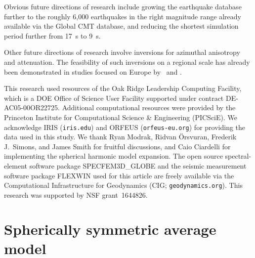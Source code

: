 \documentclass[extra,mreferee]{gji}
\begin{document}

Obvious future directions of research include growing the earthquake database further to the roughly 6,000 earthquakes in the right magnitude range already available via the Global CMT database,
and reducing the shortest simulation period further from 17~s to 9~s.

Other future directions of research involve inversions for azimuthal anisotropy
and attenuation.
The feasibility of such inversions on a regional scale has already been demonstrated in studies focused on Europe by~\cite{ZhuTromp2013} and \cite{Zhuetal2013}.

\begin{acknowledgments}
This research used resources of the Oak Ridge Leadership Computing Facility,
which is a DOE Office of Science User Facility supported under contract DE-AC05-00OR22725.
Additional computational resources were provided by the Princeton Institute
for Computational Science \& Engineering (PICSciE).
We acknowledge IRIS ({\tt iris.edu}) and ORFEUS ({\tt orfeus-eu.org}) for
providing the data used in this study.
We thank Ryan Modrak, Ridvan \"{O}rsvuran, Frederik J.\ Simons, and James Smith for fruitful discussions,
and Caio Ciardelli for implementing the spherical harmonic model expansion.
The open source spectral-element software package SPECFEM3D\_GLOBE and
the seismic measurement software package FLEXWIN used for this article are
 freely available via the Computational Infrastructure for Geodynamics
 (CIG; {\tt geodynamics.org}).
 This research was supported by NSF grant~1644826.
\end{acknowledgments}

\newpage



\newpage
\appendix

\section{Spherically symmetric average model}
\label{sec:1Dmodel}
\end{document}
